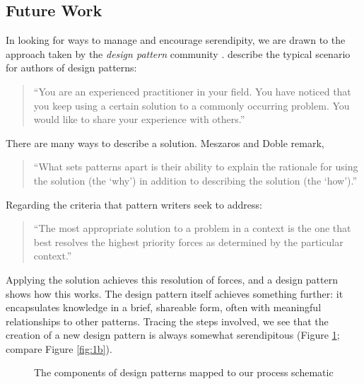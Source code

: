 \subsection{Future Work} \label{sec:futurework} \label{sec:hatching}

In looking for ways to manage and encourage serendipity, we are drawn
to the approach taken by the \emph{design pattern} community
\cite{alexander1999origins}. 
 describe the typical scenario for authors of design patterns:
\begin{quote}
\noindent ``You are an experienced practitioner in your field.  You
have noticed that you keep using a certain solution to a commonly
occurring problem.  You would like to share your experience with
others.''
\end{quote}
There are many ways to describe a solution.
Meszaros and Doble remark,
\begin{quote}
\noindent ``What sets patterns apart is their ability to explain the
rationale for using the solution (the `why') in addition to describing
the solution (the `how').''
\end{quote}
Regarding the criteria that pattern writers seek to address: 
\begin{quote}
\noindent ``The most appropriate solution to a problem in a context is
the one that best resolves the highest priority forces as determined
by the particular context.''
\end{quote}

%
%
Applying the solution achieves this resolution of forces, and a design
pattern shows how this works.  The design pattern itself achieves
something further: it encapsulates knowledge in a brief, shareable
form, often with meaningful relationships to other patterns.  Tracing
the steps involved, we see that the creation of a new design pattern
is always somewhat serendipitous (Figure \ref{fig:pattern-schematic};
compare Figure \ref{fig:1b}).

\begin{figure}

\caption{The components of design patterns mapped to our process schematic\label{fig:pattern-schematic}}
\end{figure}

